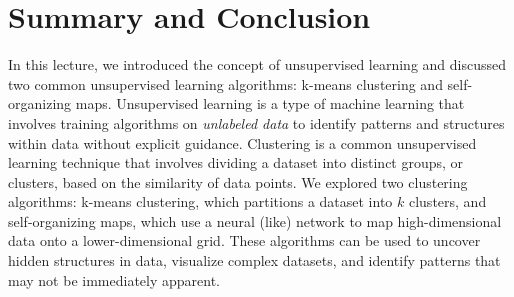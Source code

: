 \documentclass{article}[12pt]
\begin{document}
\section{Summary and Conclusion}
In this lecture, we introduced the concept of unsupervised learning and discussed two common unsupervised learning algorithms: k-means clustering and self-organizing maps.
Unsupervised learning is a type of machine learning that involves training algorithms on \textit{unlabeled data} to identify patterns and structures within data without explicit guidance.
Clustering is a common unsupervised learning technique that involves dividing a dataset into distinct groups, or clusters, based on the similarity of data points.
We explored two clustering algorithms: k-means clustering, which partitions a dataset into $k$ clusters, and self-organizing maps, which use a neural (like) network to map high-dimensional data onto a lower-dimensional grid.
These algorithms can be used to uncover hidden structures in data, visualize complex datasets, and identify patterns that may not be immediately apparent.


\end{document}
